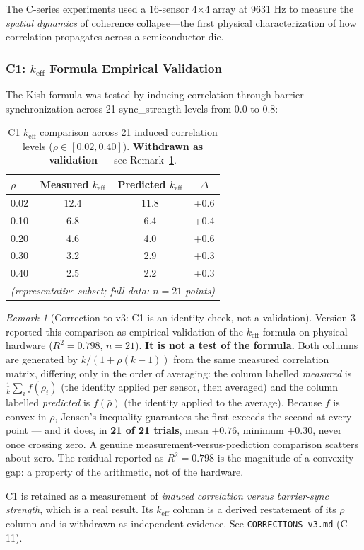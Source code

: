 \documentclass[11pt,a4paper]{article}
\theoremstyle{definition}
\theoremstyle{remark}
\newtheorem{remark}{Remark}[section]
\newcommand{\keff}{k_{\text{eff}}}
\begin{document}
The C-series experiments used a 16-sensor 4$\times$4 array at 9631 Hz to measure the \textit{spatial dynamics} of coherence collapse---the first physical characterization of how correlation propagates across a semiconductor die.

\subsubsection{C1: $\keff$ Formula Empirical Validation}

The Kish formula was tested by inducing correlation through barrier synchronization across 21 sync\_strength levels from 0.0 to 0.8:

\begin{table}[H]
\centering
\begin{tabular}{lccc}
\toprule
\textbf{$\rho$} & \textbf{Measured $\keff$} & \textbf{Predicted $\keff$} & \textbf{$\Delta$} \\
\midrule
0.02 & 12.4 & 11.8 & +0.6 \\
0.10 & 6.8 & 6.4 & +0.4 \\
0.20 & 4.6 & 4.0 & +0.6 \\
0.30 & 3.2 & 2.9 & +0.3 \\
0.40 & 2.5 & 2.2 & +0.3 \\
\multicolumn{4}{c}{\textit{(representative subset; full data: $n=21$ points)}} \\
\bottomrule
\end{tabular}
\caption{C1 $\keff$ comparison across 21 induced correlation levels ($\rho \in [0.02, 0.40]$). \textbf{Withdrawn as validation} --- see Remark~\ref{rem:c1-identity}.}
\end{table}

\begin{remark}[Correction to v3: C1 is an identity check, not a validation]
\label{rem:c1-identity}
Version 3 reported this comparison as empirical validation of the $\keff$ formula on physical hardware ($R^2 = 0.798$, $n=21$). \textbf{It is not a test of the formula.} Both columns are generated by $k/(1+\rho(k-1))$ from the same measured correlation matrix, differing only in the order of averaging: the column labelled \emph{measured} is $\frac{1}{k}\sum_i f(\rho_i)$ (the identity applied per sensor, then averaged) and the column labelled \emph{predicted} is $f(\bar{\rho})$ (the identity applied to the average). Because $f$ is convex in $\rho$, Jensen's inequality guarantees the first exceeds the second at every point --- and it does, in \textbf{21 of 21 trials}, mean $+0.76$, minimum $+0.30$, never once crossing zero. A genuine measurement-versus-prediction comparison scatters about zero. The residual reported as $R^2 = 0.798$ is the magnitude of a convexity gap: a property of the arithmetic, not of the hardware.

C1 is retained as a measurement of \emph{induced correlation versus barrier-sync strength}, which is a real result. Its $\keff$ column is a derived restatement of its $\rho$ column and is withdrawn as independent evidence. See \texttt{CORRECTIONS\_v3.md} (C-11).
\end{remark}
\end{document}
